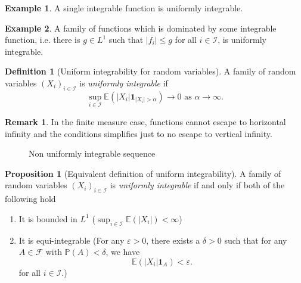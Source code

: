 \documentclass[parskip=full]{article}
\theoremstyle{definition}
\newtheorem*{definition}{Definition}
\newtheorem{proposition}{Proposition}[section]
\newtheorem*{remark}{Remark}
\newtheorem*{example}{Example}
\newcommand{\Pbb}{\mathbb{P}}
\newcommand{\1}{\mathbbm{1}}
\newcommand{\E}{\mathbb{E}}
\begin{document}
\begin{example}
  A single integrable function is uniformly integrable. 
\end{example}

\begin{example}
  A family of functions which is dominated by some integrable function, i.e. there is $g \in L^1$ such that $|f_i| \leq g$ for all $i \in \mathcal{I}$, is uniformly integrable.
  \end{example}

\begin{definition}[Uniform integrability for random variables]
  A family of random variables $(X_i)_{i \in \mathcal{I}}$ is \emph{uniformly integrable} if
  \[
    \sup_{i \in \mathcal{I}} \E(|X_i| \mathbf{1}_{|X_i| > \alpha}) \to 0 \text{ as } \alpha \to \infty.
  \]
\end{definition}

\begin{remark}
  In the finite measure case, functions cannot escape to horizontal infinity and the conditions simplifies just to no escape to vertical infinity.
\end{remark}

\begin{figure}[h]
  \centering
  \caption{Non uniformly integrable sequence}
\end{figure}

\begin{proposition}[Equivalent definition of uniform integrability]
  A family of random variables $(X_i)_{i \in \mathcal{I}}$ is \emph{uniformly integrable} if and only if both of the following hold
  \begin{enumerate}
    \item It is bounded in $L^1$ ($\sup_{i \in \mathcal{I}} \E(|X_i|) < \infty$)
    \item It is equi-integrable (For any $\varepsilon > 0$, there exists a $\delta > 0$ such that for any $A \in \mathcal{F}$ with $\Pbb(A) < \delta$, we have
    \[
      \E(|X_i| \mathbf{1}_A) < \varepsilon.
    \]
    for all $i \in \mathcal{I}$.)
  \end{enumerate}
\end{proposition}
\end{document}
